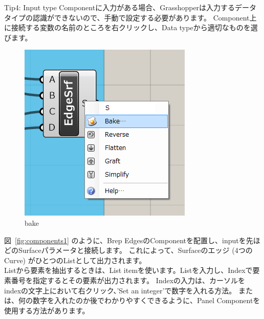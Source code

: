 \documentclass[11pt]{jarticle}
\begin{document}
\begin{itembox}[l]{Tip4: Input type}
  Componentに入力がある場合、Grasshopperは入力するデータタイプの認識ができないので、手動で設定する必要があります。
  Component上に接続する変数の名前のところを右クリックし、Data typeから適切なものを選びます。

\begin{figure}[H]
  \centering
    \includegraphics[width=0.8\linewidth]{fig/bake.png}
    \caption{bake}
  \label{fig:scanipflow}
\end{figure}

\end{itembox}
図~\ref{fig:components1} のように、Brep EdgesのComponentを配置し、inputを先ほどのSurfaceパラメータと接続します。
これによって、Surfaceのエッジ (4つのCurve) がひとつのListとして出力されます。\\
Listから要素を抽出するときは、List itemを使います。Listを入力し、Indexで要素番号を指定するとその要素が出力されます。
Indexの入力は、カーソルをindexの文字上において右クリック、'Set an integer'で数字を入れる方法。
または、何の数字を入れたのか後でわかりやすくできるように、Panel Componentを使用する方法があります。\\
\end{document}
